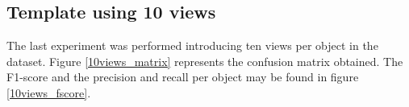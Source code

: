 \subsection{Template using 10 views}
The last experiment was performed introducing ten views per object in the dataset. 
Figure \ref{10views_matrix} represents the confusion matrix obtained. 
The F1-score and the precision and recall per object may be found in figure \ref{10views_fscore}.


